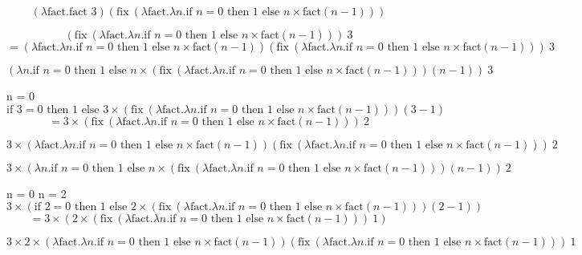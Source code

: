\documentclass{article}
\theoremstyle{theorem}
\theoremstyle{definition}
\theoremstyle{remark}
\begin{document}
 
\[
(\lambda \text{fact}. \text{fact } 3) (\text{fix} \ (\lambda \text{fact}. \lambda n. \text{if } n = 0 \text{ then } 1 \text{ else } n \times \text{fact}(n - 1)))
\]

 
\[
(\text{fix} \ (\lambda \text{fact}. \lambda n. \text{if } n = 0 \text{ then } 1 \text{ else } n \times \text{fact}(n - 1))) \ 3
\]
\[
= (\lambda \text{fact}. \lambda n. \text{if } n = 0 \text{ then } 1 \text{ else } n \times \text{fact}(n - 1)) (\text{fix} \ (\lambda \text{fact}. \lambda n. \text{if } n = 0 \text{ then } 1 \text{ else } n \times \text{fact}(n - 1))) \ 3
\]

\[
(\lambda n. \text{if } n = 0 \text{ then } 1 \text{ else } n \times (\text{fix} \ (\lambda \text{fact}. \lambda n. \text{if } n = 0 \text{ then } 1 \text{ else } n \times \text{fact}(n - 1))) (n - 1)) \ 3
\]

  n = 0
\[
\text{if } 3 = 0 \text{ then } 1 \text{ else } 3 \times (\text{fix} \ (\lambda \text{fact}. \lambda n. \text{if } n = 0 \text{ then } 1 \text{ else } n \times \text{fact}(n - 1))) (3 - 1)
\]
\[
= 3 \times (\text{fix} \ (\lambda \text{fact}. \lambda n. \text{if } n = 0 \text{ then } 1 \text{ else } n \times \text{fact}(n - 1))) \ 2
\]

  
\[
3 \times (\lambda \text{fact}. \lambda n. \text{if } n = 0 \text{ then } 1 \text{ else } n \times \text{fact}(n - 1)) (\text{fix} \ (\lambda \text{fact}. \lambda n. \text{if } n = 0 \text{ then } 1 \text{ else } n \times \text{fact}(n - 1))) \ 2
\]

\[
3 \times (\lambda n. \text{if } n = 0 \text{ then } 1 \text{ else } n \times (\text{fix} \ (\lambda \text{fact}. \lambda n. \text{if } n = 0 \text{ then } 1 \text{ else } n \times \text{fact}(n - 1))) (n - 1)) \ 2
\]

  n = 0  n = 2
\[
3 \times (\text{if } 2 = 0 \text{ then } 1 \text{ else } 2 \times (\text{fix} \ (\lambda \text{fact}. \lambda n. \text{if } n = 0 \text{ then } 1 \text{ else } n \times \text{fact}(n - 1))) (2 - 1))
\]
\[
= 3 \times (2 \times (\text{fix} \ (\lambda \text{fact}. \lambda n. \text{if } n = 0 \text{ then } 1 \text{ else } n \times \text{fact}(n - 1))) \ 1)
\]

  
\[
3 \times 2 \times (\lambda \text{fact}. \lambda n. \text{if } n = 0 \text{ then } 1 \text{ else } n \times \text{fact}(n - 1)) (\text{fix} \ (\lambda \text{fact}. \lambda n. \text{if } n = 0 \text{ then } 1 \text{ else } n \times \text{fact}(n - 1))) \ 1
\]
\end{document}
